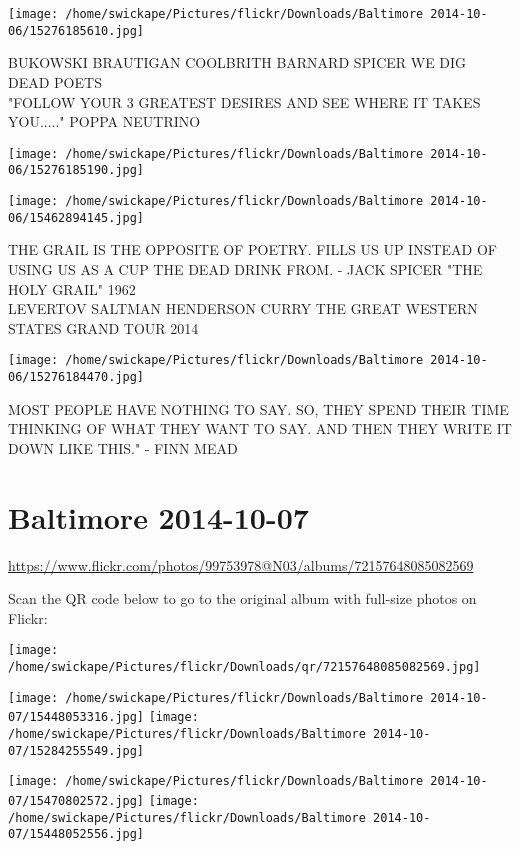 \documentclass[10pt,letterpaper]{article}
\begin{document}
\vspace{0.25in}
\texttt{[image: /home/swickape/Pictures/flickr/Downloads/Baltimore 2014-10-06/15276185610.jpg]}

BUKOWSKI BRAUTIGAN COOLBRITH BARNARD SPICER WE DIG DEAD POETS\\
"FOLLOW YOUR 3 GREATEST DESIRES AND SEE WHERE IT TAKES YOU....." POPPA NEUTRINO
\pagebreak

\texttt{[image: /home/swickape/Pictures/flickr/Downloads/Baltimore 2014-10-06/15276185190.jpg]}

\vspace{0.25in}
\texttt{[image: /home/swickape/Pictures/flickr/Downloads/Baltimore 2014-10-06/15462894145.jpg]}

THE GRAIL IS THE OPPOSITE OF POETRY.  FILLS US UP INSTEAD OF USING US AS A CUP THE DEAD DRINK FROM.  {-} JACK SPICER "THE HOLY GRAIL" 1962\\
LEVERTOV SALTMAN HENDERSON CURRY THE GREAT WESTERN STATES GRAND TOUR 2014
\pagebreak

\texttt{[image: /home/swickape/Pictures/flickr/Downloads/Baltimore 2014-10-06/15276184470.jpg]}

MOST PEOPLE HAVE NOTHING TO SAY.  SO, THEY SPEND THEIR TIME THINKING OF WHAT THEY WANT TO SAY.  AND THEN THEY WRITE IT DOWN LIKE THIS." {-} FINN MEAD
\pagebreak

\section*{Baltimore 2014-10-07}

\url{https://www.flickr.com/photos/99753978@N03/albums/72157648085082569}

Scan the QR code below to go to the original album with full-size photos on Flickr:

\texttt{[image: /home/swickape/Pictures/flickr/Downloads/qr/72157648085082569.jpg]}
\pagebreak

\texttt{[image: /home/swickape/Pictures/flickr/Downloads/Baltimore 2014-10-07/15448053316.jpg]}
\texttt{[image: /home/swickape/Pictures/flickr/Downloads/Baltimore 2014-10-07/15284255549.jpg]}

\texttt{[image: /home/swickape/Pictures/flickr/Downloads/Baltimore 2014-10-07/15470802572.jpg]}
\texttt{[image: /home/swickape/Pictures/flickr/Downloads/Baltimore 2014-10-07/15448052556.jpg]}
\end{document}
